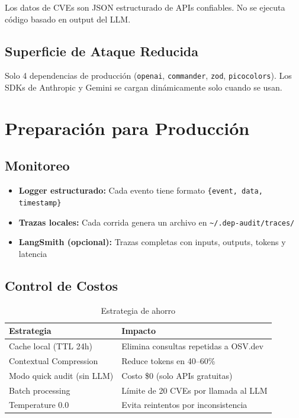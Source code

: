 \documentclass[11pt,a4paper]{article}
\begin{document}
Los datos de CVEs son JSON estructurado de APIs confiables. No se ejecuta código basado en output del LLM.

\subsection{Superficie de Ataque Reducida}

Solo 4 dependencias de producción (\texttt{openai}, \texttt{commander}, \texttt{zod}, \texttt{picocolors}). Los SDKs de Anthropic y Gemini se cargan dinámicamente solo cuando se usan.

\section{Preparación para Producción}

\subsection{Monitoreo}

\begin{itemize}
  \item \textbf{Logger estructurado:} Cada evento tiene formato \texttt{\{event, data, timestamp\}}
  \item \textbf{Trazas locales:} Cada corrida genera un archivo en \texttt{\textasciitilde{}/.dep-audit/traces/}
  \item \textbf{LangSmith (opcional):} Trazas completas con inputs, outputs, tokens y latencia
\end{itemize}

\subsection{Control de Costos}

\begin{table}[H]
  \centering
  \caption{Estrategia de ahorro}
  \begin{tabularx}{\textwidth}{l X}
    \toprule
    \textbf{Estrategia} & \textbf{Impacto} \\
    \midrule
    Cache local (TTL 24h) & Elimina consultas repetidas a OSV.dev \\
    Contextual Compression & Reduce tokens en 40--60\% \\
    Modo quick audit (sin LLM) & Costo \$0 (solo APIs gratuitas) \\
    Batch processing & Límite de 20 CVEs por llamada al LLM \\
    Temperature 0.0 & Evita reintentos por inconsistencia \\
    \bottomrule
  \end{tabularx}
\end{table}
\end{document}
